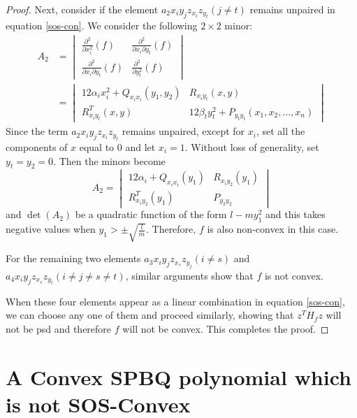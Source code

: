 \documentclass[12pt]{elsarticle}
\theoremstyle{definition}
\begin{document}
\begin{proof}
Next, consider if the element $a_2x_iy_jz_{x_i}z_{y_t}(j\neq t)$ remains unpaired in equation \eqref{sos-con}. We consider the following $2\times 2$ minor:
\[
\begin{aligned}
A_2&=\begin{vmatrix}
    \frac{\partial^2}{\partial x_i^2}(f) & \frac{\partial^2}{\partial x_i \partial y_t}(f)\\
    \frac{\partial^2}{\partial x_i \partial y_t}(f) & \frac{\partial^2}{\partial y_t^2}(f)
\end{vmatrix}\\
& = \begin{vmatrix}
    12\alpha_i x_i^2 + Q_{x_{i}x_{i}}(y_1,y_2) & R_{x_{i}y_{t}}(x,y)\\
    R_{x_{i}y_{t}}^T(x,y) & 12\beta_t y_t^2 + P_{y_{t}y_{t}}(x_1,x_2,\dots,x_n)
\end{vmatrix}
\end{aligned}
\]
Since the term $a_2x_iy_jz_{x_i}z_{y_t}$ remains unpaired, except for $x_i$, set all the components of $x$ equal to $0$ and let $x_i=1$. Without loss of generality, set $y_t = y_2 =0$. Then the minors become
\[
A_2=\begin{vmatrix}
    12\alpha_i  + Q_{x_{i}x_{i}}(y_1) & R_{x_{i}y_{2}}(y_1)\\
    R_{x_{i}y_{2}}^T(y_1) &  P_{y_{2}y_{2}}
\end{vmatrix}
\]
and $\det(A_2)$ be a quadratic function of the form $l - my_1^2$ and this takes negative values when $y_1 > \pm\sqrt{\frac{l}{m}}$. Therefore, $f$ is also non-convex in this case.

For the remaining two elements $a_3x_iy_jz_{x_s}z_{y_j}(i\neq s)$ and $a_4x_iy_jz_{x_s}z_{y_t}(i\neq j\neq s\neq t)$, similar arguments show that $f$ is not convex.

When these four elements appear as a linear combination in equation \eqref{sos-con}, we can choose any one of them and proceed similarly, showing that $z^TH_f z$ will not be psd and therefore $f$ will not be convex. This completes the proof.
\end{proof}

\section{A Convex SPBQ polynomial which is not SOS-Convex}\label{spbq counter}
\end{document}
